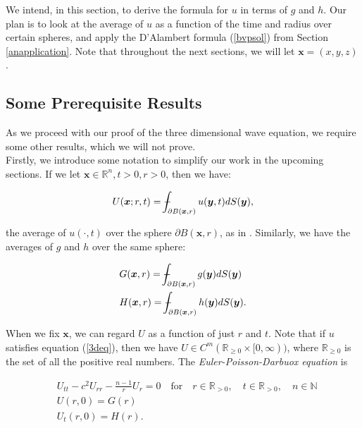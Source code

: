 \documentclass[a4paper, 12pt]{article}
\def\Xint#1{\mathchoice
{\XXint\displaystyle\textstyle{#1}}%
{\XXint\textstyle\scriptstyle{#1}}%
{\XXint\scriptstyle\scriptscriptstyle{#1}}%
{\XXint\scriptscriptstyle\scriptscriptstyle{#1}}%
\!\int}
\def\XXint#1#2#3{{\setbox0=\hbox{$#1{#2#3}{\int}$ }
\vcenter{\hbox{$#2#3$ }}\kern-.6\wd0}}
\def\dashint{\Xint-}
\numberwithin{equation}{section}
\begin{document}
We intend, in this section, to derive the formula for $u$ in terms of $g$ and $h$. Our plan is to look at the average of $u$ as a
function of the time and radius over certain spheres, and apply the D'Alambert formula (\ref{bvpsol}) from Section \ref{anapplication}.
Note that throughout the next sections, we will let $\boldsymbol{x}=(x,y,z)$.

\subsection{Some Prerequisite Results} \label{prereq}
As we proceed with our proof of the three dimensional wave equation, we require some other results, which we will not prove.
\\

Firstly, we introduce some notation to simplify our work in the upcoming sections. If we let $\boldsymbol{x}\in \mathbb{R}^n, t>0, r>0$, then we have:

\begin{equation} \label{averageU}
    U(\boldsymbol{x};r,t)=\dashint_{\partial B(\boldsymbol{x},r)}u(\boldsymbol{y},t)dS(\boldsymbol{y}),
\end{equation}

the average of $u(\cdot,t)$ over the sphere $\partial B(\boldsymbol{x},r)$, as in \cite{Ev}. Similarly, we have the averages of $g$ and $h$ over the same sphere:

\begin{equation} \label{averageGH}
    \begin{aligned}
        &G(\boldsymbol{x},r)=\dashint_{\partial B(\boldsymbol{x},r)}g(\boldsymbol{y})dS(\boldsymbol{y})\\
        &H(\boldsymbol{x},r)=\dashint_{\partial B(\boldsymbol{x},r)}h(\boldsymbol{y})dS(\boldsymbol{y}).
    \end{aligned}
\end{equation}

When we fix $\boldsymbol{x}$, we can regard $U$ as a function of just $r$ and $t$. Note that if $u$ satisfies equation
(\ref{3deq}), then we have $U \in C^m(\mathbb{R}_{\ge 0}\times[0,\infty))$, where $\mathbb{R}_{\ge 0}$ is the set of all the positive real numbers. The \emph{Euler-Poisson-Darbuox equation} is

\begin{equation} \label{EPDeq}
    \begin{aligned}
        &U_{tt}-c^2U_{rr}-\frac{n-1}{r}U_r=0 \quad \textrm {for} \quad r \in \mathbb{R}_{>0}, \quad t \in \mathbb{R}_{>0}, \quad n \in \mathbb{N}\\
        &U(r, 0)=G(r)\\
        &U_t(r,0)=H(r).
    \end{aligned}
\end{equation}
\end{document}
